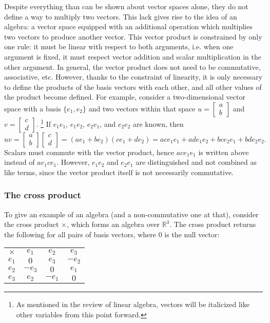 \documentclass{article}
\begin{document}
Despite everything than can be shown about vector spaces alone,
they do not define a way to multiply two vectors.
This lack gives rise to the idea of an algebra:
a vector space equipped with an additional operation
which multiplies two vectors to produce another vector.
This vector product is constrained by only one rule:
it must be linear with respect to both arguments,
i.e. when one argument is fixed,
it must respect vector addition and scalar multiplication in the other argument.
In general, the vector product does not need to be commutative, associative, etc.
However, thanks to the constraint of linearity,
it is only necessary to define the products of the basis vectors with each other,
and all other values of the product become defined.
For example, consider a two-dimensional vector space
with a basis $\{e_1, e_2\}$
and two vectors within that space
$u = \begin{bmatrix} a \\ b \end{bmatrix}$
and $v = \begin{bmatrix} c \\ d \end{bmatrix}$.
\footnote{As mentioned in the review of linear algebra,
  vectors will be italicized like other variables from this point forward.}
If $e_1e_1$, $e_1e_2$, $e_2e_1$, and $e_2e_2$ are known,
then
\[
uv
= \begin{bmatrix} a \\ b \end{bmatrix}
\begin{bmatrix} c \\ d \end{bmatrix}
= (ae_1+be_2)(ce_1+de_2)
= ace_1e_1+ade_1e_2+bce_2e_1+bde_2e_2.
\]
Scalars must commute with the vector product,
hence $ace_1e_1$ is written above instead of $ae_1ce_1$.
However, $e_1e_2$ and $e_2e_1$ are distinguished
and not combined as like terms,
since the vector product itself is not necessarily commutative.

\subsubsection{The cross product}

To give an example of an algebra (and a non-commutative one at that),
consider the cross product $\times$, which forms an algebra over $\mathbb{R}^3$.
The cross product returns the following for all pairs of basis vectors,
where $0$ is the null vector:

\begin{center}
  \begin{tabular}{|c||c|c|c|}
    \hline
    $\times$ & $e_1$ & $e_2$ & $e_3$ \\ \hhline{|=#=|=|=|}
    $e_1$ & $0$ & $e_3$ & $-e_2$ \\ \hline
    $e_2$ & $-e_3$ & $0$ & $e_1$ \\ \hline
    $e_3$ & $e_2$ & $-e_1$ & $0$ \\ \hline
  \end{tabular}
\end{center}
\end{document}
